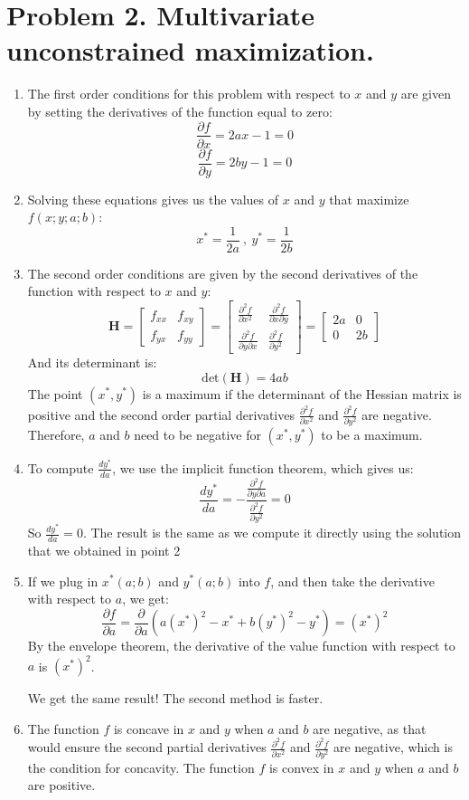 \documentclass[UTF8,titlepage]{article}
\numberwithin{figure}{section}
\begin{document}
\clearpage
\section{Problem 2. Multivariate unconstrained maximization.}
\begin{enumerate}
    \item The first order conditions for this problem with respect to $x$ and $y$ are given by setting the derivatives of the function equal to zero:
    \[\frac{\partial f}{\partial x} = 2ax - 1 = 0 \]
    \[\frac{\partial f}{\partial y} = 2by - 1 = 0 \]
    \item Solving these equations gives us the values of $x$ and $y$ that maximize $f(x; y; a; b)$:
    \[x^* = \frac{1}{2a}\ ,\  y^* = \frac{1}{2b}\]
    \item The second order conditions are given by the second derivatives of the function with respect to $x$ and $y$:
    \[\mathbf{H} = \begin{bmatrix} f_{xx} & f_{xy} \\ f_{yx} & f_{yy} \end{bmatrix} = \begin{bmatrix} \frac{\partial^2 f}{\partial x^2} & \frac{\partial^2 f}{\partial x \partial y} \\ \frac{\partial^2 f}{\partial y \partial x} & \frac{\partial^2 f}{\partial y^2} \end{bmatrix} = \begin{bmatrix} 2a & 0 \\ 0 & 2b \end{bmatrix}\]
    And its determinant is:
    \[\text{det}(\mathbf{H}) = 4ab\]
    The point $(x^*, y^*)$ is a maximum if the determinant of the Hessian matrix is positive and the second order partial derivatives $\frac{\partial^2 f}{\partial x^2}$ and $\frac{\partial^2 f}{\partial y^2}$ are negative. Therefore, $a$ and $b$ need to be negative for $(x^*, y^*)$ to be a maximum.
    \item To compute $\frac{dy^*}{da}$, we use the implicit function theorem, which gives us:
    \[\frac{dy^*}{da} = -\frac{\frac{\partial^2 f}{\partial y \partial a}}{\frac{\partial^2 f}{\partial y^2}} = 0\]
    So $\frac{dy^*}{da} = 0$. The result is the same as we compute it directly using the solution that we obtained in point 2 
    \item If we plug in $x^*(a; b)$ and $y^*(a; b)$ into $f$, and then take the derivative with respect to $a$, we get:
    \[\frac{\partial f}{\partial a} = \frac{\partial}{\partial a}(a(x^*)^2 - x^* + b(y^*)^2 - y^*) = (x^*)^2\]
    By the envelope theorem, the derivative of the value function with respect to $a$ is $(x^*)^2$. 
    
    We get the same result! The second method is faster.
    \item The function $f$ is concave in $x$ and $y$ when $a$ and $b$ are negative, as that would ensure the second partial derivatives $\frac{\partial^2 f}{\partial x^2}$ and $\frac{\partial^2 f}{\partial y^2}$ are negative, which is the condition for concavity. The function $f$ is convex in $x$ and $y$ when $a$ and $b$ are positive.
\end{enumerate}
\clearpage
\end{document}
